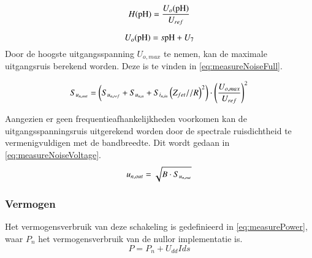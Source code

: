 \begin{equation}
    H(\mathrm{pH}) = \frac{U_o(\mathrm{pH})}{U_{ref}}
    \label{eq:measureTransfer}
\end{equation}

\begin{equation}\label{eq:measureOutVoltage}
    U_o(\ph) = s\ph + U_7
    \tagaddtext{[\si{\volt}]}
\end{equation}
Door de hoogste uitgangsspanning $U_{o,max}$ te nemen, kan de maximale uitgangsruis berekend worden. Deze is te vinden in \autoref{eq:measureNoiseFull}.

\begin{equation}\label{eq:measureNoiseFull}
    S_{u_{{n,out}}} = \left(S_{u_{{n,ref}}} + S_{u_{{n,n}}} + S_{i_{{n,in}}}\left(Z_{fet} // R\right)^2\right) \cdot \left(\frac{U_{o,max}}{U_{ref}}\right)^2
    \tagaddtext{[\si{\volt\squared\per\hertz}]}
\end{equation}

Aangezien er geen frequentieafhankelijkheden voorkomen kan de uitgangsspanningsruis uitgerekend worden door de spectrale ruisdichtheid te vermenigvuldigen met de bandbreedte. Dit wordt gedaan in \autoref{eq:measureNoiseVoltage}.
\begin{equation}\label{eq:measureNoiseVoltage}
    u_{n,out} = \sqrt{B \cdot S_{u_{{n,out}}}}
    \tagaddtext{[\si{\volt}]}
\end{equation}

\subsubsection{Vermogen}
Het vermogensverbruik van deze schakeling is gedefinieerd in \autoref{eq:measurePower}, waar $P_n$ het vermogensverbruik van de nullor implementatie is. 
\begin{equation}\label{eq:measurePower}
    P = P_n + U_{dd}I{ds}
\end{equation}
